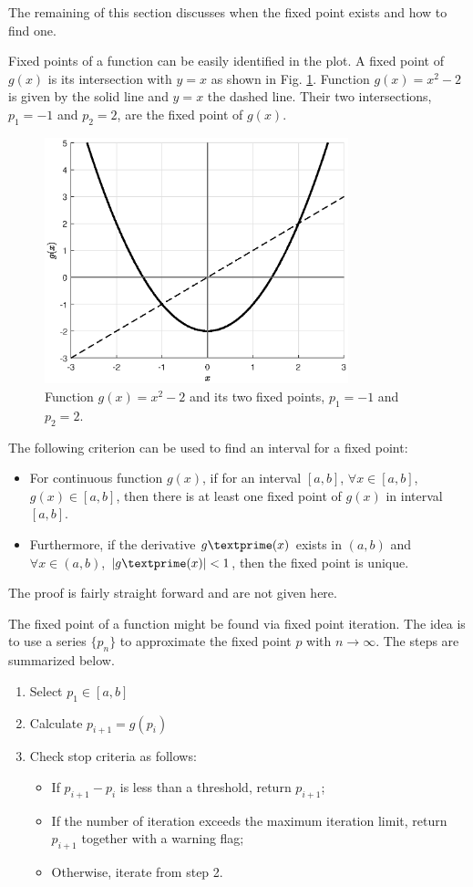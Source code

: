 The remaining of this section discusses when the fixed point exists and how to find one.

Fixed points of a function can be easily identified in the plot. A fixed point of $g(x)$ is its intersection with $y=x$ as shown in Fig. \ref{fig:part-5:fixed_point}. Function $g(x)=x^2-2$ is given by the solid line and $y=x$ the dashed line. Their two intersections, $p_1=-1$ and $p_2=2$, are the fixed point of $g(x)$.

\begin{figure}[!htbp]
\centering
\includegraphics[width=250pt]{chapters/part-5/figures/demo_fixed_point.eps}
\caption{Function $g(x)=x^2-2$ and its two fixed points, $p_1=-1$ and $p_2=2$.} \label{fig:part-5:fixed_point}
\end{figure}

The following criterion can be used to find an interval for a fixed point: 
\begin{itemize}
  \item For continuous function $g(x)$, if for an interval $[a, b]$, $\forall x \in [a, b]$, $g(x)\in [a, b]$, then there is at least one fixed point of $g(x)$ in interval $[a, b]$.
  \item Furthermore, if the derivative $g\textprime(x)$ exists in $(a, b)$ and $\forall x \in (a, b)$, $|g\textprime(x)|<1$, then the fixed point is unique.
\end{itemize}
The proof is fairly straight forward and are not given here.

The fixed point of a function might be found via fixed point iteration. The idea is to use a series $\{p_n\}$ to approximate the fixed point $p$ with $n\rightarrow\infty$. The steps are summarized below.
\begin{enumerate}
  \item Select $p_1\in[a, b]$
  \item Calculate $p_{i+1} = g(p_i)$
  \item Check stop criteria as follows:
  \begin{itemize}
    \item If $p_{i+1}-p_i$ is less than a threshold, return $p_{i+1}$;
    \item If the number of iteration exceeds the maximum iteration limit, return $p_{i+1}$ together with a warning flag;
    \item Otherwise, iterate from step 2.
  \end{itemize}
\end{enumerate}

